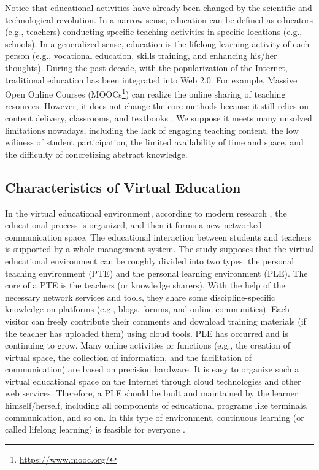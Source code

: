 \documentclass[conference]{IEEEtran}
\begin{document}
Notice that educational activities have already been changed by the scientific and technological revolution. In a narrow sense, education can be defined as educators (e.g., teachers) conducting specific teaching activities in specific locations (e.g., schools). In a generalized sense, education is the lifelong learning activity of each person (e.g., vocational education, skills training, and enhancing his/her thoughts). During the past decade, with the popularization of the Internet, traditional education has been integrated into Web 2.0. For example, Massive Open Online Courses (MOOCs\footnote{\url{https://www.mooc.org/}}) can realize the online sharing of teaching resources. However, it does not change the core methods because it still relies on content delivery, classrooms, and textbooks \cite{friesen2017textbook}. We suppose it meets many unsolved limitations nowadays, including the lack of engaging teaching content, the low wiliness of student participation, the limited availability of time and space, and the difficulty of concretizing abstract knowledge.


\subsection{Characteristics of Virtual Education}

In the virtual educational environment, according to modern research \cite{starichenko2015interaction, paik2004facilitating}, the educational process is organized, and then it forms a new networked communication space. The educational interaction between students and teachers is supported by a whole management system. The study \cite{yavich2017design} supposes that the virtual educational environment can be roughly divided into two types: the personal teaching environment (PTE) and the personal learning environment (PLE). The core of a PTE is the teachers (or knowledge sharers). With the help of the necessary network services and tools, they share some discipline-specific knowledge on platforms (e.g., blogs, forums, and online communities). Each visitor can freely contribute their comments and download training materials (if the teacher has uploaded them) using cloud tools. PLE has occurred and is continuing to grow. Many online activities or functions (e.g., the creation of virtual space, the collection of information, and the facilitation of communication) are based on precision hardware. It is easy to organize such a virtual educational space on the Internet through cloud technologies \cite{starichenko2015professional} and other web services. Therefore, a PLE should be built and maintained by the learner himself/herself, including all components of educational programs like terminals, communication, and so on. In this type of environment, continuous learning (or called lifelong learning) is feasible for everyone \cite{noguchi2015communities, singh2015global}.
\end{document}
